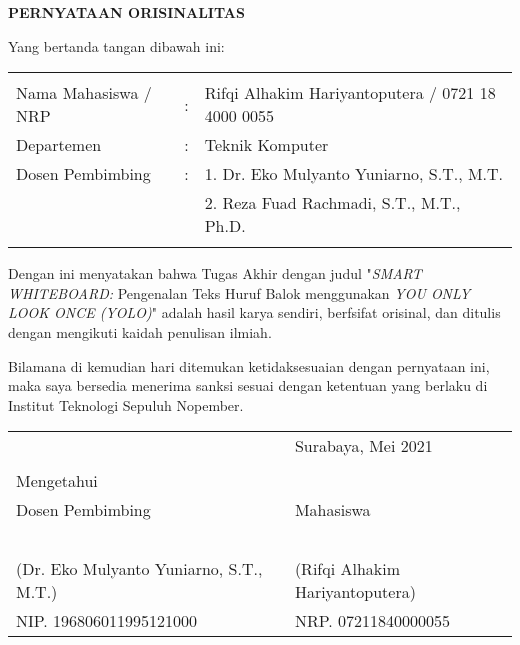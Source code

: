 \begin{center}
  \large
  \textbf{PERNYATAAN ORISINALITAS}
\end{center}

\thispagestyle{empty}

\vspace{2ex}


\noindent Yang bertanda tangan dibawah ini:

\noindent\begin{tabularx}{\textwidth}{X l l}
  & & \\
  Nama Mahasiswa / NRP &: & Rifqi Alhakim Hariyantoputera / 0721 18 4000 0055 \\
  Departemen &: & Teknik Komputer \\
  Dosen Pembimbing &: & 1. Dr. Eko Mulyanto Yuniarno, S.T., M.T. \\
  & & 2. Reza Fuad Rachmadi, S.T., M.T., Ph.D. \\
  & & \\
\end{tabularx}

Dengan ini menyatakan bahwa Tugas Akhir dengan judul "\emph{SMART WHITEBOARD:} Pengenalan Teks Huruf Balok menggunakan \emph{YOU ONLY LOOK ONCE (YOLO)}" adalah hasil karya sendiri, berfsifat orisinal, dan ditulis dengan mengikuti kaidah penulisan ilmiah.

Bilamana di kemudian hari ditemukan ketidaksesuaian dengan pernyataan ini, maka saya bersedia menerima sanksi sesuai dengan ketentuan yang berlaku di Institut Teknologi Sepuluh Nopember.

\vspace{8ex}

\noindent\begin{tabularx}{\textwidth}{X l}
  & Surabaya, Mei 2021\\
  & \\
  Mengetahui & \\
  Dosen Pembimbing & Mahasiswa\\
  & \\
  & \\
  & \\
  & \\
  & \\
  (Dr. Eko Mulyanto Yuniarno, S.T., M.T.) & (Rifqi Alhakim Hariyantoputera) \\
  NIP. 196806011995121000 & NRP. 07211840000055\\
\end{tabularx}